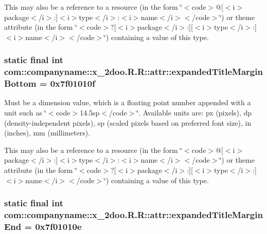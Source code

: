 This may also be a reference to a resource (in the form \char`\"{}$<$code$>$@\mbox{[}$<$i$>$package$<$/i$>$:\mbox{]}$<$i$>$type$<$/i$>$:$<$i$>$name$<$/i$>$$<$/code$>$\char`\"{}) or theme attribute (in the form \char`\"{}$<$code$>$?\mbox{[}$<$i$>$package$<$/i$>$:\mbox{]}\mbox{[}$<$i$>$type$<$/i$>$:\mbox{]}$<$i$>$name$<$/i$>$$<$/code$>$\char`\"{}) containing a value of this type. \hypertarget{classcom_1_1companyname_1_1x__2doo_1_1_r_1_1attr_755e19e1142648c5041500a0e2461e07}{
\subsubsection[{expandedTitleMarginBottom}]{\setlength{\rightskip}{0pt plus 5cm}static final int com::companyname::x\_\-2doo.R.R::attr::expandedTitleMarginBottom = 0x7f01010f}}
\label{classcom_1_1companyname_1_1x__2doo_1_1_r_1_1attr_755e19e1142648c5041500a0e2461e07}


Must be a dimension value, which is a floating point number appended with a unit such as \char`\"{}$<$code$>$14.5sp$<$/code$>$\char`\"{}. Available units are: px (pixels), dp (density-independent pixels), sp (scaled pixels based on preferred font size), in (inches), mm (millimeters). 

This may also be a reference to a resource (in the form \char`\"{}$<$code$>$@\mbox{[}$<$i$>$package$<$/i$>$:\mbox{]}$<$i$>$type$<$/i$>$:$<$i$>$name$<$/i$>$$<$/code$>$\char`\"{}) or theme attribute (in the form \char`\"{}$<$code$>$?\mbox{[}$<$i$>$package$<$/i$>$:\mbox{]}\mbox{[}$<$i$>$type$<$/i$>$:\mbox{]}$<$i$>$name$<$/i$>$$<$/code$>$\char`\"{}) containing a value of this type. \hypertarget{classcom_1_1companyname_1_1x__2doo_1_1_r_1_1attr_c7cd763121dc0ab7771c30223b99a2cb}{
\subsubsection[{expandedTitleMarginEnd}]{\setlength{\rightskip}{0pt plus 5cm}static final int com::companyname::x\_\-2doo.R.R::attr::expandedTitleMarginEnd = 0x7f01010e}}
\label{classcom_1_1companyname_1_1x__2doo_1_1_r_1_1attr_c7cd763121dc0ab7771c30223b99a2cb}


